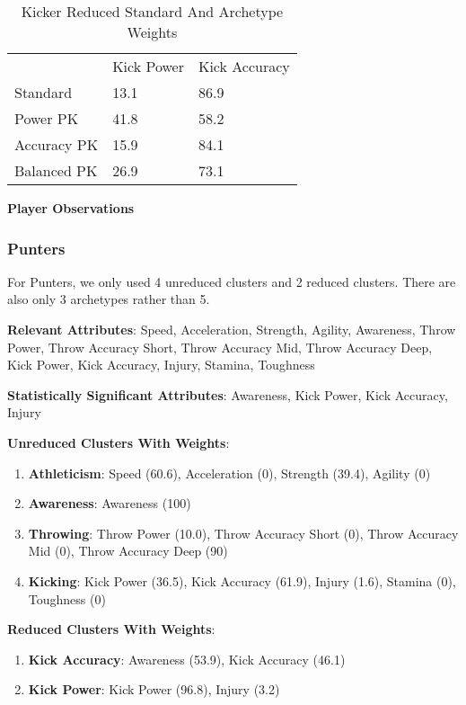\documentclass[11pt]{article}
\begin{document}
\begin{table}[]
\centering
\caption{Kicker Reduced Standard And Archetype Weights}
\label{KickerReducedWeights}
\begin{tabular}{lll}
            & Kick Power & Kick Accuracy \\
Standard    & 13.1       & 86.9          \\
Power PK    & 41.8       & 58.2          \\
Accuracy PK & 15.9       & 84.1          \\
Balanced PK & 26.9       & 73.1         
\end{tabular}
\end{table}

\textbf{Player Observations}

\subsubsection{Punters}

For Punters, we only used 4 unreduced clusters and 2 reduced clusters. There are also only 3 archetypes rather than 5.

\textbf{Relevant Attributes}: Speed, Acceleration, Strength, Agility, Awareness, Throw Power, Throw Accuracy Short, Throw Accuracy Mid, Throw Accuracy Deep, Kick Power, Kick Accuracy, Injury, Stamina, Toughness

\textbf{Statistically Significant Attributes}: Awareness, Kick Power, Kick Accuracy, Injury

\textbf{Unreduced Clusters With Weights}:

\begin{enumerate}
\item{\textbf{Athleticism}}: Speed (60.6), Acceleration (0), Strength (39.4), Agility (0)
\item{\textbf{Awareness}}: Awareness (100)
\item{\textbf{Throwing}}: Throw Power (10.0), Throw Accuracy Short (0), Throw Accuracy Mid (0), Throw Accuracy Deep (90)
\item{\textbf{Kicking}}: Kick Power (36.5), Kick Accuracy (61.9), Injury (1.6), Stamina (0), Toughness (0)
\end{enumerate}

\textbf{Reduced Clusters With Weights}:

\begin{enumerate}
\item{\textbf{Kick Accuracy}}: Awareness (53.9), Kick Accuracy (46.1)
\item{\textbf{Kick Power}}: Kick Power (96.8), Injury (3.2)
\end{enumerate}
\end{document}
